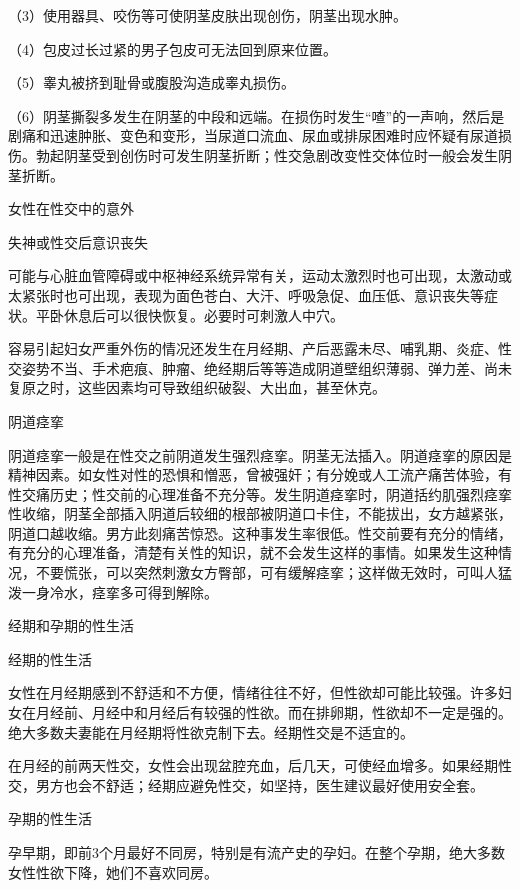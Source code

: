 \documentclass[12pt,UTF8]{ctexbook}
\begin{document}
（3）使用器具、咬伤等可使阴茎皮肤出现创伤，阴茎出现水肿。

（4）包皮过长过紧的男子包皮可无法回到原来位置。

（5）睾丸被挤到耻骨或腹股沟造成睾丸损伤。

（6）阴茎撕裂多发生在阴茎的中段和远端。在损伤时发生“喳”的一声响，然后是剧痛和迅速肿胀、变色和变形，当尿道口流血、尿血或排尿困难时应怀疑有尿道损伤。勃起阴茎受到创伤时可发生阴茎折断；性交急剧改变性交体位时一般会发生阴茎折断。





女性在性交中的意外


失神或性交后意识丧失

可能与心脏血管障碍或中枢神经系统异常有关，运动太激烈时也可出现，太激动或太紧张时也可出现，表现为面色苍白、大汗、呼吸急促、血压低、意识丧失等症状。平卧休息后可以很快恢复。必要时可刺激人中穴。

容易引起妇女严重外伤的情况还发生在月经期、产后恶露未尽、哺乳期、炎症、性交姿势不当、手术疤痕、肿瘤、绝经期后等等造成阴道壁组织薄弱、弹力差、尚未复原之时，这些因素均可导致组织破裂、大出血，甚至休克。

阴道痉挛

阴道痉挛一般是在性交之前阴道发生强烈痉挛。阴茎无法插入。阴道痉挛的原因是精神因素。如女性对性的恐惧和憎恶，曾被强奸；有分娩或人工流产痛苦体验，有性交痛历史；性交前的心理准备不充分等。发生阴道痉挛时，阴道括约肌强烈痉挛性收缩，阴茎全部插入阴道后较细的根部被阴道口卡住，不能拔出，女方越紧张，阴道口越收缩。男方此刻痛苦惊恐。这种事发生率很低。性交前要有充分的情绪，有充分的心理准备，清楚有关性的知识，就不会发生这样的事情。如果发生这种情况，不要慌张，可以突然刺激女方臀部，可有缓解痉挛；这样做无效时，可叫人猛泼一身冷水，痉挛多可得到解除。





经期和孕期的性生活


经期的性生活

女性在月经期感到不舒适和不方便，情绪往往不好，但性欲却可能比较强。许多妇女在月经前、月经中和月经后有较强的性欲。而在排卵期，性欲却不一定是强的。绝大多数夫妻能在月经期将性欲克制下去。经期性交是不适宜的。

在月经的前两天性交，女性会出现盆腔充血，后几天，可使经血增多。如果经期性交，男方也会不舒适；经期应避免性交，如坚持，医生建议最好使用安全套。

孕期的性生活

孕早期，即前3个月最好不同房，特别是有流产史的孕妇。在整个孕期，绝大多数女性性欲下降，她们不喜欢同房。
\end{document}
